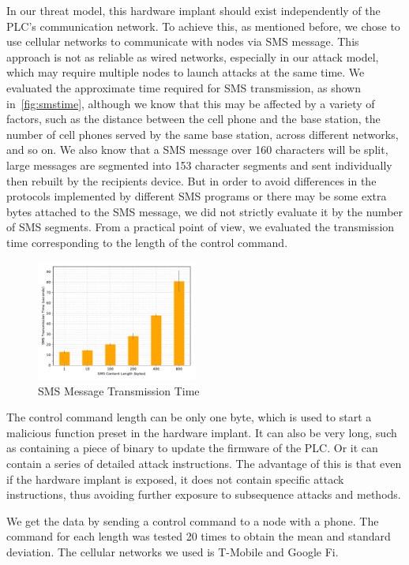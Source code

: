 In our threat model, this hardware implant should exist independently of the PLC's communication network. To achieve this, as mentioned before, we chose to use cellular networks to communicate with nodes via SMS message. This approach is not as reliable as wired networks, especially in our attack model, which may require multiple nodes to launch attacks at the same time. We evaluated the approximate time required for SMS transmission, as shown in~\autoref{fig:smstime}, although we know that this may be affected by a variety of factors, such as the distance between the cell phone and the base station, the number of cell phones served by the same base station, across different networks, and so on. We also know that a SMS message over 160 characters will be split, large messages are segmented into 153 character segments and sent individually then rebuilt by the recipients device. But in order to avoid differences in the protocols implemented by different SMS programs or there may be some extra bytes attached to the SMS message, we did not strictly evaluate it by the number of SMS segments. From a practical point of view, we evaluated the transmission time corresponding to the length of the control command.

\begin{figure}[th]
	\includegraphics[width=0.47\textwidth]{figures/smstime}
	\centering
	\caption{SMS Message Transmission Time}
	\label{fig:smstime}
\end{figure}

The control command length can be only one byte, which is used to start a malicious function preset in the hardware implant. It can also be very long, such as containing a piece of binary to update the firmware of the PLC. Or it can contain a series of detailed attack instructions. The advantage of this is that even if the hardware implant is exposed, it does not contain specific attack instructions, thus avoiding further exposure to subsequence attacks and methods.

We get the data by sending a control command to a node with a phone. The command for each length was tested 20 times to obtain the mean and standard deviation. The cellular networks we used is T-Mobile and Google Fi. 

